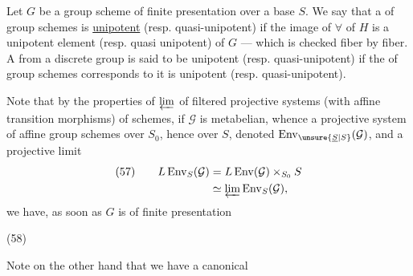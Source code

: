 Let $G$ be a group scheme  of finite presentation over a base $S$.
We say that a  of group schemes
is  \uline{unipotent} (resp. quasi-unipotent) if the image of $\forall$  of $H$ is a unipotent element (resp. quasi unipotent) of $G$ --- which is checked fiber by fiber. A  from a discrete group
is said to be unipotent (resp. quasi-unipotent) if the  of group schemes   corresponds to it
is unipotent (resp. quasi-unipotent).



Note that by the properties of $\varprojlim$ of filtered projective systems (with affine transition morphisms)  of schemes, if $\mathcal{G}$ is metabelian, whence a projective system of affine group schemes over $S_0$, hence over $S$, denoted $\operatorname{Env}_{\unsure{\underline{S}|S}}(\mathcal{G})$, and a projective limit
\[
\begin{aligned}
(57)\qquad L\operatorname{Env}_S(\mathcal{G})
 &=L\operatorname{Env}(\mathcal{G})\times_{S_0}S\\
 &\simeq\varprojlim\operatorname{Env}_S(\mathcal{G}),
\end{aligned}
\]
we have, as soon as $G$ is  of finite presentation

\begin{samepage}
(58)\quad
{}
\end{samepage}

Note on the other hand that we have a  canonical 

